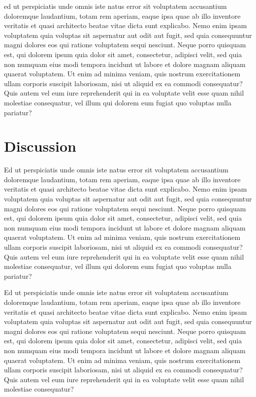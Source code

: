 \documentclass[10pt,a4paper,twocolumn]{article}
\begin{document}
ed ut perspiciatis unde omnis iste natus error sit voluptatem accusantium doloremque laudantium, totam rem aperiam, eaque ipsa quae ab illo inventore veritatis et quasi architecto beatae vitae dicta sunt explicabo. Nemo enim ipsam voluptatem quia voluptas sit aspernatur aut odit aut fugit, sed quia consequuntur magni dolores eos qui ratione voluptatem sequi nesciunt. Neque porro quisquam est, qui dolorem ipsum quia dolor sit amet, consectetur, adipisci velit, sed quia non numquam eius modi tempora incidunt ut labore et dolore magnam aliquam quaerat voluptatem. Ut enim ad minima veniam, quis nostrum exercitationem ullam corporis suscipit laboriosam, nisi ut aliquid ex ea commodi consequatur? Quis autem vel eum iure reprehenderit qui in ea voluptate velit esse quam nihil molestiae consequatur, vel illum qui dolorem eum fugiat quo voluptas nulla pariatur?


\section{Discussion}
Ed ut perspiciatis unde omnis iste natus error sit voluptatem accusantium doloremque laudantium, totam rem aperiam, eaque ipsa quae ab illo inventore veritatis et quasi architecto beatae vitae dicta sunt explicabo. Nemo enim ipsam voluptatem quia voluptas sit aspernatur aut odit aut fugit, sed quia consequuntur magni dolores eos qui ratione voluptatem sequi nesciunt. Neque porro quisquam est, qui dolorem ipsum quia dolor sit amet, consectetur, adipisci velit, sed quia non numquam eius modi tempora incidunt ut labore et dolore magnam aliquam quaerat voluptatem. Ut enim ad minima veniam, quis nostrum exercitationem ullam corporis suscipit laboriosam, nisi ut aliquid ex ea commodi consequatur? Quis autem vel eum iure reprehenderit qui in ea voluptate velit esse quam nihil molestiae consequatur, vel illum qui dolorem eum fugiat quo voluptas nulla pariatur?


Ed ut perspiciatis unde omnis iste natus error sit voluptatem accusantium doloremque laudantium, totam rem aperiam, eaque ipsa quae ab illo inventore veritatis et quasi architecto beatae vitae dicta sunt explicabo. Nemo enim ipsam voluptatem quia voluptas sit aspernatur aut odit aut fugit, sed quia consequuntur magni dolores eos qui ratione voluptatem sequi nesciunt. Neque porro quisquam est, qui dolorem ipsum quia dolor sit amet, consectetur, adipisci velit, sed quia non numquam eius modi tempora incidunt ut labore et dolore magnam aliquam quaerat voluptatem. Ut enim ad minima veniam, quis nostrum exercitationem ullam corporis suscipit laboriosam, nisi ut aliquid ex ea commodi consequatur? Quis autem vel eum iure reprehenderit qui in ea voluptate velit esse quam nihil molestiae consequatur?
\end{document}
